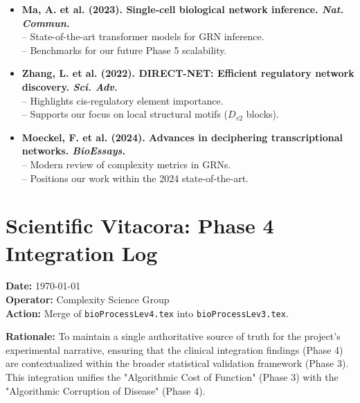 \documentclass{article}
\begin{document}
\begin{itemize}
    \item \textbf{Ma, A. et al. (2023). Single-cell biological network inference. \textit{Nat. Commun.}} \\
    -- State-of-the-art transformer models for GRN inference.\\
    -- Benchmarks for our future Phase 5 scalability.

    \item \textbf{Zhang, L. et al. (2022). DIRECT-NET: Efficient regulatory network discovery. \textit{Sci. Adv.}} \\
    -- Highlights cis-regulatory element importance.\\
    -- Supports our focus on local structural motifs ($D_{v2}$ blocks).

    \item \textbf{Moeckel, F. et al. (2024). Advances in deciphering transcriptional networks. \textit{BioEssays}.} \\
    -- Modern review of complexity metrics in GRNs.\\
    -- Positions our work within the 2024 state-of-the-art.
\end{itemize}

\section{Scientific Vitacora: Phase 4 Integration Log}
\textbf{Date:} \today \\
\textbf{Operator:} Complexity Science Group \\
\textbf{Action:} Merge of \texttt{bioProcessLev4.tex} into \texttt{bioProcessLev3.tex}.

\textbf{Rationale:}
To maintain a single authoritative source of truth for the project's experimental narrative, ensuring that the clinical integration findings (Phase 4) are contextualized within the broader statistical validation framework (Phase 3). This integration unifies the "Algorithmic Cost of Function" (Phase 3) with the "Algorithmic Corruption of Disease" (Phase 4).
\end{document}
